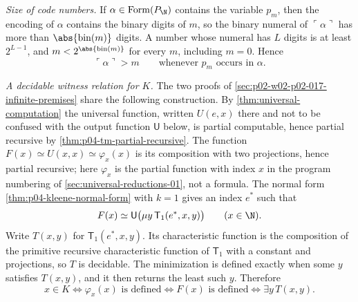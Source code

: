 \emph{Size of code numbers.}  If \(\alpha\in\operatorname{Form}(P_{\N})\) contains the
variable \(p_m\), then the encoding of \(\alpha\) contains the binary
digits of \(m\), so the binary numeral of \(\ulcorner\alpha\urcorner\) has
more than \(\abs{\operatorname{bin}(m)}\) digits.  A number whose numeral
has \(L\) digits is at least \(2^{L-1}\), and
\(m<2^{\abs{\operatorname{bin}(m)}}\) for every \(m\), including
\(m=0\).  Hence
\begin{equation}
 \ulcorner\alpha\urcorner>m
 \qquad\text{whenever }p_m\text{ occurs in }\alpha .
 \tag{S1}
\end{equation}

\emph{A decidable witness relation for \(K\).}  The two proofs of
\cref{sec:p02-w02-p02-017-infinite-premises} share the following
construction.  By \cref{thm:universal-computation} the universal function, written
\(U(e,x)\) there and not to be confused with the output function
\(\mathsf U\) below, is partial computable, hence partial recursive by
\cref{thm:p04-tm-partial-recursive}.  The function
\(F(x)\simeq U(x,x)\simeq\varphi_x(x)\) is its composition with two
projections, hence partial recursive; here \(\varphi_x\) is the
partial function with index \(x\) in the program numbering of
\cref{sec:universal-reductions-01},
not a formula.  The normal form
\cref{thm:p04-kleene-normal-form} with \(k=1\) gives an index \(e^{*}\)
such that
\[
 F(x)\simeq\mathsf U\bigl(\mu y\,\mathsf T_1(e^{*},x,y)\bigr)
 \qquad(x\in\N).
\]
Write \(T(x,y)\) for \(\mathsf T_1(e^{*},x,y)\).  Its characteristic
function is the composition of the primitive recursive characteristic
function of \(\mathsf T_1\) with a constant and projections, so \(T\) is
decidable.  The minimization is defined exactly when some \(y\) satisfies
\(T(x,y)\), and it then returns the least such \(y\).  Therefore
\begin{equation}
 x\in K
 \iff \varphi_x(x)\text{ is defined}
 \iff F(x)\text{ is defined}
 \iff \exists y\,T(x,y).
 \tag{S2}
\end{equation}


